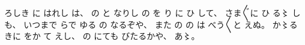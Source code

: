%
ろしき
に
はれし
は、
%
の
と
なりし
の
を
り
に
ひ
して、
%
さま〴〵に
ひ
る〻%
しも、
%
いつまで
らで
ゆる
の
なるぞや、
%
また
の
の
は
べう〳〵と
えぬ。
%
か〻る%
きに
をか
て
えし、
%
の
にても
びたるかや、
%
あ〻。%
